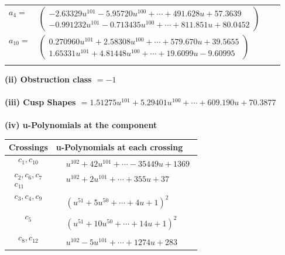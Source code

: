 \documentclass[1p]{elsarticle_modified}
\theoremstyle{definition}
\begin{document}
\begin{tabular}{m{7pt} m{180pt} m{7pt} m{180pt} }
\flushright $a_{4}=$&$\begin{pmatrix}-2.63329 u^{101}-5.95720 u^{100}+\cdots+491.628 u+57.3639\\-0.991232 u^{101}-0.713435 u^{100}+\cdots+811.851 u+80.0452\end{pmatrix}$ \\
\flushright $a_{10}=$&$\begin{pmatrix}0.270960 u^{101}+2.58308 u^{100}+\cdots+579.670 u+39.5655\\1.65331 u^{101}+4.81448 u^{100}+\cdots+19.6099 u-9.60995\end{pmatrix}$\\&\end{tabular}
\flushleft \textbf{(ii) Obstruction class $= -1$}\\~\\
\flushleft \textbf{(iii) Cusp Shapes $= 1.51275 u^{101}+5.29401 u^{100}+\cdots+609.190 u+70.3877$}\\~\\
\newpage\renewcommand{\arraystretch}{1}
\flushleft \textbf{(iv) u-Polynomials at the component}\newline \\
\begin{tabular}{m{50pt}|m{274pt}}
Crossings & \hspace{64pt}u-Polynomials at each crossing \\
\hline $$\begin{aligned}c_{1},c_{10}\end{aligned}$$&$\begin{aligned}
&u^{102}+42 u^{101}+\cdots-35449 u+1369
\end{aligned}$\\
\hline $$\begin{aligned}c_{2},c_{6},c_{7}\\c_{11}\end{aligned}$$&$\begin{aligned}
&u^{102}+2 u^{101}+\cdots+355 u+37
\end{aligned}$\\
\hline $$\begin{aligned}c_{3},c_{4},c_{9}\end{aligned}$$&$\begin{aligned}
&(u^{51}+5 u^{50}+\cdots+4 u+1)^{2}
\end{aligned}$\\
\hline $$\begin{aligned}c_{5}\end{aligned}$$&$\begin{aligned}
&(u^{51}+10 u^{50}+\cdots+14 u+1)^{2}
\end{aligned}$\\
\hline $$\begin{aligned}c_{8},c_{12}\end{aligned}$$&$\begin{aligned}
&u^{102}-5 u^{101}+\cdots+1274 u+283
\end{aligned}$\\
\hline
\end{tabular}\\~\\
\end{document}
